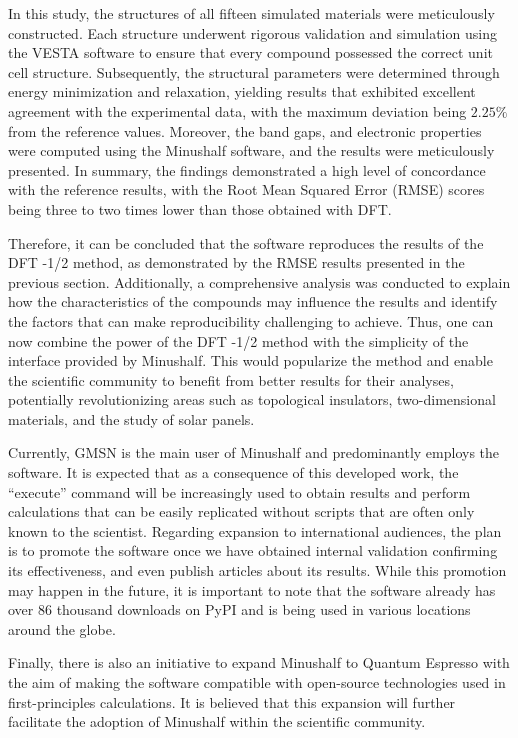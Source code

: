 In this study, the structures of all fifteen simulated materials were meticulously constructed. Each structure underwent rigorous validation and simulation using the VESTA software to ensure that every compound possessed the correct unit cell structure. Subsequently, the structural parameters were determined through energy minimization and relaxation, yielding results that exhibited excellent agreement with the experimental data, with the maximum deviation being $2.25\%$ from the reference values. Moreover, the band gaps, and electronic properties were computed using the Minushalf software, and the results were meticulously presented. In summary, the findings demonstrated a high level of concordance with the reference results, with the Root Mean Squared Error (RMSE) scores being three to two times lower than those obtained with DFT.

Therefore, it can be concluded that the software reproduces the results of the DFT -1/2 method, as demonstrated by the RMSE results presented in the previous section. Additionally, a comprehensive analysis was conducted to explain how the characteristics of the compounds may influence the results and identify the factors that can make reproducibility challenging to achieve. Thus, one can now combine the power of the DFT -1/2 method with the simplicity of the interface provided by Minushalf. This would popularize the method and enable the scientific community to benefit from better results for their analyses, potentially revolutionizing areas such as topological insulators, two-dimensional materials, and the study of solar panels.

Currently, GMSN is the main user of Minushalf and predominantly employs the software. It is expected that as a consequence of this developed work, the ``execute'' command will be increasingly used to obtain results and perform calculations that can be easily replicated without scripts that are often only known to the scientist. Regarding expansion to international audiences, the plan is to promote the software once we have obtained internal validation confirming its effectiveness, and even publish articles about its results. While this promotion may happen in the future, it is important to note that the software already has over 86 thousand downloads on PyPI and is being used in various locations around the globe.

Finally, there is also an initiative to expand Minushalf to Quantum Espresso with the aim of making the software compatible with open-source technologies used in first-principles calculations. It is believed that this expansion will further facilitate the adoption of Minushalf within the scientific community.